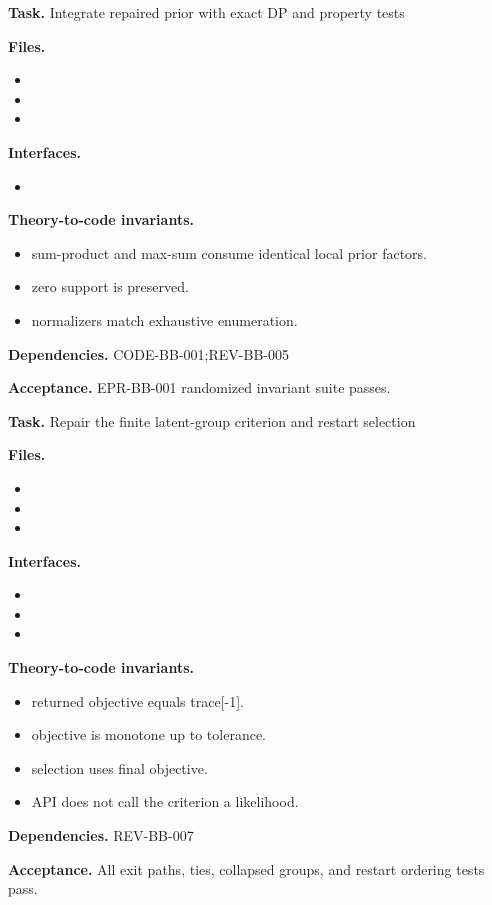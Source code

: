 \begin{statusbox}[CODE-BB-002]
\textbf{Task.} Integrate repaired prior with exact DP and property tests\par
\textbf{Files.}
\begin{itemize}[leftmargin=1.7em,itemsep=1.5pt,topsep=2pt]
\item {}
\item {}
\item {}
\end{itemize}
\textbf{Interfaces.}
\begin{itemize}[leftmargin=1.7em,itemsep=1.5pt,topsep=2pt]
\item {}
\end{itemize}
\textbf{Theory-to-code invariants.}
\begin{itemize}[leftmargin=1.7em,itemsep=1.5pt,topsep=2pt]
\item sum-product and max-sum consume identical local prior factors.
\item zero support is preserved.
\item normalizers match exhaustive enumeration.
\end{itemize}
\textbf{Dependencies.} CODE-BB-001;REV-BB-005\par
\textbf{Acceptance.} EPR-BB-001 randomized invariant suite passes.
\end{statusbox}

\begin{statusbox}[CODE-BB-003]
\textbf{Task.} Repair the finite latent-group criterion and restart selection\par
\textbf{Files.}
\begin{itemize}[leftmargin=1.7em,itemsep=1.5pt,topsep=2pt]
\item {}
\item {}
\item {}
\end{itemize}
\textbf{Interfaces.}
\begin{itemize}[leftmargin=1.7em,itemsep=1.5pt,topsep=2pt]
\item {}
\item {}
\item {}
\end{itemize}
\textbf{Theory-to-code invariants.}
\begin{itemize}[leftmargin=1.7em,itemsep=1.5pt,topsep=2pt]
\item returned objective equals trace[-1].
\item objective is monotone up to tolerance.
\item selection uses final objective.
\item API does not call the criterion a likelihood.
\end{itemize}
\textbf{Dependencies.} REV-BB-007\par
\textbf{Acceptance.} All exit paths, ties, collapsed groups, and restart ordering tests pass.
\end{statusbox}


